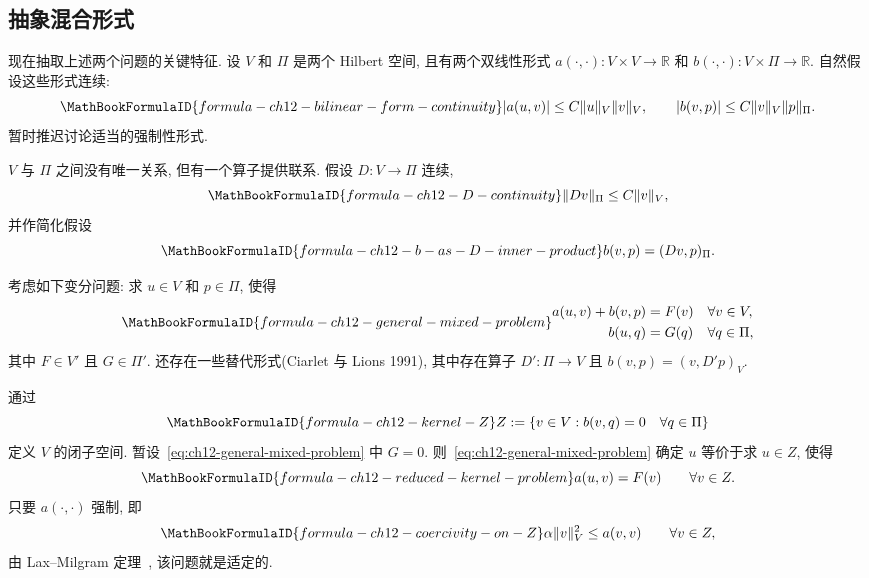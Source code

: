 \subsection{抽象混合形式}
\label{sec:ch12-abstract-mixed-formulation}
\setcounter{thmcount}{0}
\setcounter{equation}{0}

现在抽取上述两个问题的关键特征. 设 $V$ 和 $\Pi$ 是两个 Hilbert 空间, 且有两个双线性形式 $a(\cdot,\cdot):V\times V\to\mathbb R$ 和 $b(\cdot,\cdot):V\times\Pi\to\mathbb R$. 自然假设这些形式连续:
\begin{equation}
\MathBookFormulaID{formula-ch12-bilinear-form-continuity}
\label{eq:ch12-bilinear-form-continuity}
|a(u,v)|\leq C\|u\|_V\|v\|_V,
\qquad
|b(v,p)|\leq C\|v\|_V\|p\|_\Pi.
\end{equation}
暂时推迟讨论适当的强制性形式.

$V$ 与 $\Pi$ 之间没有唯一关系, 但有一个算子提供联系. 假设 $D:V\to\Pi$ 连续,
\begin{equation}
\MathBookFormulaID{formula-ch12-D-continuity}
\label{eq:ch12-D-continuity}
\|Dv\|_\Pi\leq C\|v\|_V,
\end{equation}
并作简化假设
\begin{equation}
\MathBookFormulaID{formula-ch12-b-as-D-inner-product}
\label{eq:ch12-b-as-D-inner-product}
b(v,p)=(Dv,p)_\Pi.
\end{equation}

考虑如下变分问题: 求 $u\in V$ 和 $p\in\Pi$, 使得
\begin{equation}
\MathBookFormulaID{formula-ch12-general-mixed-problem}
\label{eq:ch12-general-mixed-problem}
\begin{aligned}
a(u,v)+b(v,p)&=F(v)&&\forall v\in V,\\
b(u,q)&=G(q)&&\forall q\in\Pi,
\end{aligned}
\end{equation}
其中 $F\in V'$ 且 $G\in\Pi'$. 还存在一些替代形式(Ciarlet 与 Lions 1991), 其中存在算子 $D':\Pi\to V$ 且 $b(v,p)=(v,D'p)_V$.

通过
\begin{equation}
\MathBookFormulaID{formula-ch12-kernel-Z}
\label{eq:ch12-kernel-Z}
Z:=\{v\in V:b(v,q)=0\quad\forall q\in\Pi\}
\end{equation}
定义 $V$ 的闭子空间. 暂设~\eqref{eq:ch12-general-mixed-problem} 中 $G=0$. 则~\eqref{eq:ch12-general-mixed-problem} 确定 $u$ 等价于求 $u\in Z$, 使得
\begin{equation}
\MathBookFormulaID{formula-ch12-reduced-kernel-problem}
\label{eq:ch12-reduced-kernel-problem}
a(u,v)=F(v)\qquad\forall v\in Z.
\end{equation}
只要 $a(\cdot,\cdot)$ 强制, 即
\begin{equation}
\MathBookFormulaID{formula-ch12-coercivity-on-Z}
\label{eq:ch12-coercivity-on-Z}
\alpha\|v\|_V^2\leq a(v,v)\qquad\forall v\in Z,
\end{equation}
由 Lax--Milgram 定理~, 该问题就是适定的.

